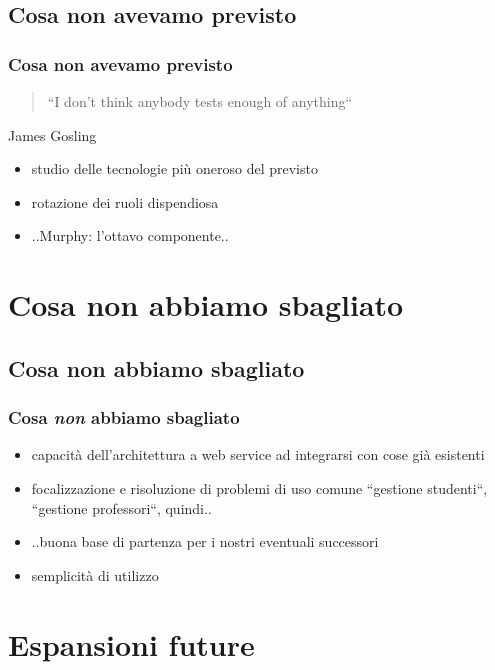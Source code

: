 \subsection*{Cosa non avevamo previsto}
\begin{frame}
\frametitle{Cosa non avevamo previsto}

\begin{quote}
``I don't think anybody tests enough of anything``
\end{quote}

\begin{flushright}
James Gosling
\end{flushright}

\begin{itemize}
\item studio delle tecnologie più oneroso del previsto
\item rotazione dei ruoli dispendiosa
\item ..Murphy: l'ottavo componente..
\end{itemize}

\end{frame}

\section{Cosa non abbiamo sbagliato}
\subsection*{Cosa non abbiamo sbagliato}
\begin{frame}
\frametitle{Cosa \emph{non} abbiamo sbagliato}

\begin{itemize}
	\item capacità dell'architettura a web service ad integrarsi con cose già esistenti
	\item focalizzazione e risoluzione di problemi di uso comune  ``gestione studenti``, ``gestione professori``, quindi..
	\item ..buona base di partenza per i nostri eventuali successori
	\item semplicità di utilizzo
\end{itemize}
\end{frame}

\section{Espansioni future}
